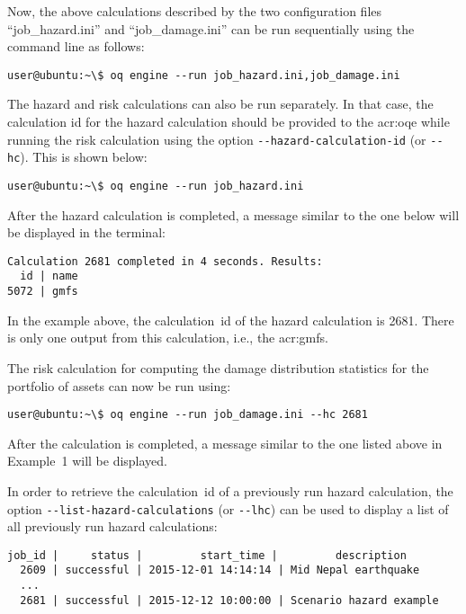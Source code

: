 Now, the above calculations described by the two configuration files
``job\_hazard.ini'' and ``job\_damage.ini'' can be run sequentially using the
command line as follows:

\begin{verbatim}
user@ubuntu:~\$ oq engine --run job_hazard.ini,job_damage.ini
\end{verbatim}

The hazard and risk calculations can also be run separately. In that case, the
calculation id for the hazard calculation should be
provided to the \glsdesc{acr:oqe} while running the risk calculation using the
option \Verb+--hazard-calculation-id+ (or \Verb+--hc+). This is shown below:

\begin{verbatim}
user@ubuntu:~\$ oq engine --run job_hazard.ini
\end{verbatim}

After the hazard calculation is completed, a message similar to the one below
will be displayed in the terminal:

\begin{verbatim}
Calculation 2681 completed in 4 seconds. Results:
  id | name
5072 | gmfs
\end{verbatim}

In the example above, the calculation~id of the hazard calculation is 2681.
There is only one output from this calculation, i.e., the \glspl{acr:gmf}.

The risk calculation for computing the damage distribution statistics for the
portfolio of \glspl{asset} can now be run using:

\begin{verbatim}
user@ubuntu:~\$ oq engine --run job_damage.ini --hc 2681
\end{verbatim}

After the calculation is completed, a message similar to the one listed above
in Example~1 will be displayed.

In order to retrieve the calculation~id of a previously run hazard calculation,
the option \Verb+--list-hazard-calculations+ (or \Verb+--lhc+) can be used to
display a list of all previously run hazard calculations:

\begin{verbatim}
job_id |     status |         start_time |         description
  2609 | successful | 2015-12-01 14:14:14 | Mid Nepal earthquake
  ...
  2681 | successful | 2015-12-12 10:00:00 | Scenario hazard example
\end{verbatim}

